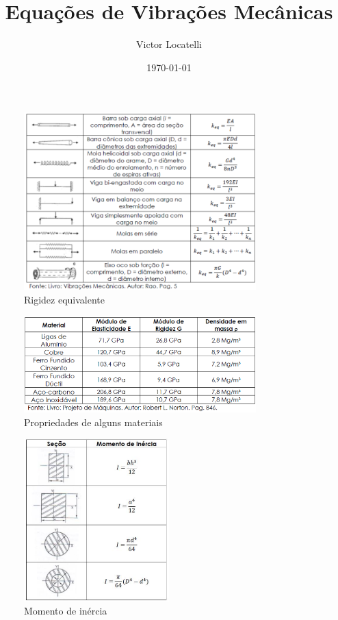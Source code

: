\documentclass[a4paper,12pt]{article}
\author{Victor Locatelli}
\title{Equações de Vibrações Mecânicas}
\date{\today}
\begin{document}
%

\begin{figure}[ht]
    \centering
    \includegraphics[width=0.8\textwidth]{imagens/rigidez_equivalente.png}
    \caption{Rigidez equivalente}
    \label{fig:rigidez_equivalente}
\end{figure}
\begin{figure}[ht]
    \centering
    \includegraphics[width=0.8\textwidth]{imagens/propriedades_materiais.png}
    \caption{Propriedades de alguns materiais}
    \label{fig:propriedades_materiais}
\end{figure}

\begin{figure}[ht]
    \centering
    \includegraphics[width=0.5\textwidth]{imagens/momento_de_inercia.png}
    \caption{Momento de inércia}
    \label{fig:imagens-momento_de_inercia-png}
\end{figure}
\end{document}
